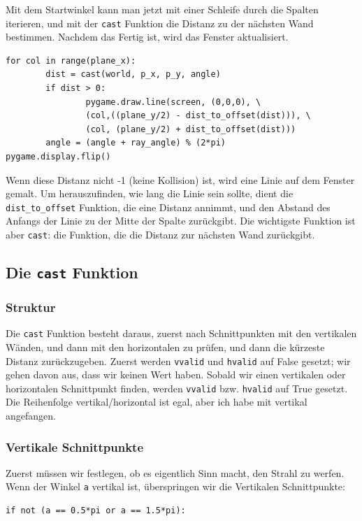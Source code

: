 \documentclass[a4paper,12pt]{report}
\begin{document}
Mit dem Startwinkel kann man jetzt mit einer Schleife durch die Spalten iterieren, und mit der \texttt{cast} Funktion die Distanz zu der nächsten Wand bestimmen. Nachdem das Fertig ist, wird das Fenster aktualisiert.
\begin{Verbatim}[baselinestretch=1.0, xleftmargin=1cm]
for col in range(plane_x):
        dist = cast(world, p_x, p_y, angle)
        if dist > 0:
                pygame.draw.line(screen, (0,0,0), \
                (col,((plane_y/2) - dist_to_offset(dist))), \
                (col, (plane_y/2) + dist_to_offset(dist)))
        angle = (angle + ray_angle) % (2*pi)
pygame.display.flip()
\end{Verbatim}
Wenn diese Distanz nicht -1 (keine Kollision) ist, wird eine Linie auf dem Fenster gemalt. Um herauszufinden, wie lang die Linie sein sollte, dient die \texttt{dist\_to\_offset} Funktion, die eine Distanz annimmt, und den Abstand des Anfangs der Linie zu der Mitte der Spalte zurückgibt. Die wichtigste Funktion ist aber \texttt{cast}: die Funktion, die die Distanz zur nächsten Wand zurückgibt.

\subsection{Die \texttt{cast} Funktion}
\subsubsection{Struktur}
Die \texttt{cast} Funktion besteht daraus, zuerst nach Schnittpunkten mit den vertikalen Wänden, und dann mit den horizontalen zu prüfen, und dann die kürzeste Distanz zurückzugeben. Zuerst werden \texttt{vvalid} und \texttt{hvalid} auf False gesetzt; wir gehen davon aus, dass wir keinen Wert haben. Sobald wir einen vertikalen oder horizontalen Schnittpunkt finden, werden \texttt{vvalid} bzw. \texttt{hvalid} auf True gesetzt. \\
Die Reihenfolge vertikal/horizontal ist egal, aber ich habe mit vertikal angefangen.
\subsubsection{Vertikale Schnittpunkte}
Zuerst müssen wir festlegen, ob es eigentlich Sinn macht, den Strahl zu werfen. Wenn der Winkel \texttt{a} vertikal ist, überspringen wir die Vertikalen Schnittpunkte:
\begin{Verbatim}[baselinestretch=1.0, xleftmargin=1cm]
if not (a == 0.5*pi or a == 1.5*pi):
\end{Verbatim}
\end{document}
